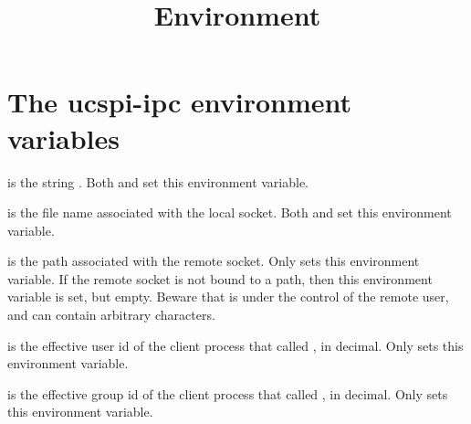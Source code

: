 \documentclass{book}
\title{Environment}
\begin{document}
\section{The ucspi-ipc environment variables}

 is the string .  Both  and
 set this environment variable.

 is the file name associated with the local
socket.  Both  and  set this environment
variable.

 is the path associated with the remote socket.
Only  sets this environment variable.  If the remote
socket is not bound to a path, then this environment variable is set,
but empty.  Beware that  is under the control of
the remote user, and can contain arbitrary characters.

 is the effective user id of the client process
that called , in decimal.  Only  sets this
environment variable.

 is the effective group id of the client process
that called , in decimal.  Only  sets this
environment variable.
\end{document}
